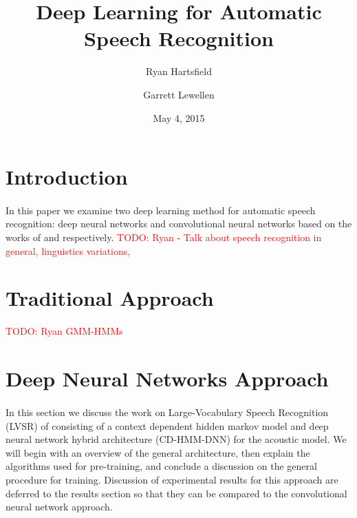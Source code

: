 \documentclass[letterpaper]{article}
\newcommand{\TODO}[1]{\textcolor{red}{TODO: #1}}
\begin{document}
\title{Deep Learning for Automatic Speech Recognition}
\author{Ryan Hartsfield \and Garrett Lewellen}
\date{May 4, 2015}

\maketitle

\doublespacing

\section*{Introduction}

\paragraph{} In this paper we examine two deep learning method for automatic speech recognition: deep neural networks and convolutional neural networks based on the works of \cite{DBLP:journals/taslp/DahlYDA12} and  \cite{DBLP:journals/taslp/Abdel-HamidMJDPY14} respectively. \TODO{Ryan - Talk about speech recognition in general, linguistics variations, }

\section*{Traditional Approach} \TODO{Ryan GMM-HMMs}

\paragraph{}

\section*{Deep Neural Networks Approach} 

\paragraph{} In this section we discuss the work on Large-Vocabulary Speech Recognition (LVSR) of \cite{DBLP:journals/taslp/DahlYDA12} consisting of a context dependent hidden markov model and deep neural network hybrid architecture (CD-HMM-DNN) for the acoustic model. We will begin with an overview of the general architecture, then explain the algorithms used for pre-training, and conclude a discussion on the general procedure for training. Discussion of experimental results for this approach are deferred to the results section so that they can be compared to the convolutional neural network approach.
\end{document}
